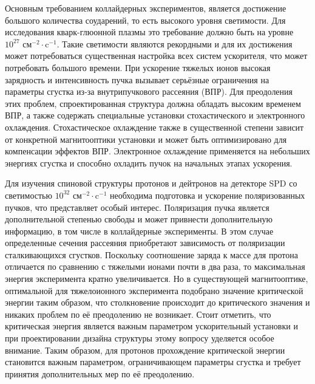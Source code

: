 \par Основным требованием коллайдерных экспериментов, является достижение большого количества соударений, то есть высокого уровня светимости. Для исследования кварк-глюонной плазмы это требование должно быть на уровне $10^{27}$ $\text{см}^{-2}\cdot\text{c}^{-1}$. Такие светимости являются рекордными и для их достижения может потребоваться существенная настройка всех систем ускорителя, что может потребовать большого времени. При ускорение тяжелых ионов высокая зарядность и интенсивность пучка вызывает серьёзные ограничения на параметры сгустка из-за внутрипучкового рассеяния (ВПР). Для преодоления этих проблем, спроектированная структура должна обладать высоким временем ВПР, а также содержать специальные установки стохастического и электронного охлаждения. Стохастическое охлаждение также в существенной степени зависит от конкретной магнитооптики установки и может быть оптимизировано для компенсации эффектов ВПР. Электронное охлаждение применяется на небольших энергиях сгустка и способно охладить пучок на начальных этапах ускорения.

\par Для изучения спиновой структуры протонов и дейтронов на детекторе SPD со светимостью $10^{32}$ $\text{см}^{-2}\cdot\text{c}^{-1}$ необходима подготовка и ускорение поляризованных пучков, что представляет особый интерес. Поляризация пучка является дополнительной степенью свободы и может привнести дополнительную информацию, в том числе в коллайдерные эксперименты. В этом случае определенные сечения рассеяния приобретают зависимость от поляризации сталкивающихся сгустков. Поскольку соотношение заряда к массе для протона отличается по сравнению с тяжелыми ионами почти в два раза, то максимальная энергия эксперимента кратно увеличивается. Но в существующей магнитооптике, оптимальной для тяжелоионного эксперимента подобрано значение критической энергии таким образом, что столкновение происходит до критического значения и никаких проблем по её преодолению не возникает. Стоит отметить, что критическая энергия является важным параметром ускорительный установки и при проектировании дизайна структуры этому вопросу уделяется особое внимание. Таким образом, для протонов прохождение критической энергии становится важным параметром, ограничивающем параметры сгустка и требует принятия дополнительных мер по её преодолению.

